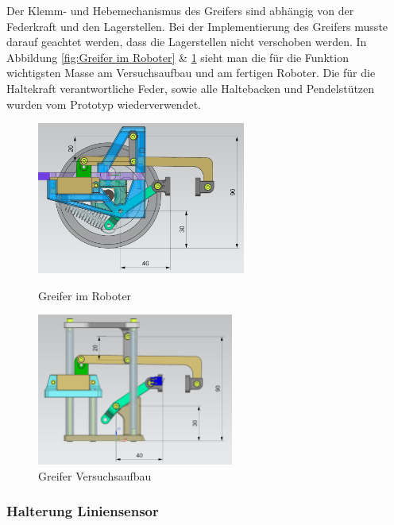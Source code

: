 Der Klemm- und Hebemechanismus des Greifers sind abhängig von der Federkraft und den Lagerstellen. Bei der Implementierung des Greifers musste darauf geachtet werden, dass die Lagerstellen nicht verschoben werden. In Abbildung \ref{fig:Greifer im Roboter} \& \ref{fig:Greifer Versuchsaufbau} sieht man die für die Funktion wichtigsten Masse am Versuchsaufbau und am fertigen Roboter. Die für die Haltekraft verantwortliche Feder, sowie alle Haltebacken und Pendelstützen wurden vom Prototyp wiederverwendet. 

\begin{figure}[H]
  \centering
  \begin{minipage}[b]{0.45\textwidth}
    \centering
    \includegraphics[height=5cm]{assets/MT/Greifer Montiert.png}
    \caption{Greifer im Roboter}
    \label{fig:Greifer im Roboter}
  \end{minipage}
  \hfill
  \begin{minipage}[b]{0.45\textwidth}
    \centering
    \includegraphics[height=5cm]{assets/MT/Greifer Prototyp.png}
    \caption{Greifer Versuchsaufbau}
    \label{fig:Greifer Versuchsaufbau}
  \end{minipage}
\end{figure}

\newpage

\subsubsection{Halterung Liniensensor}
\label{Halterung Liniensensor}

